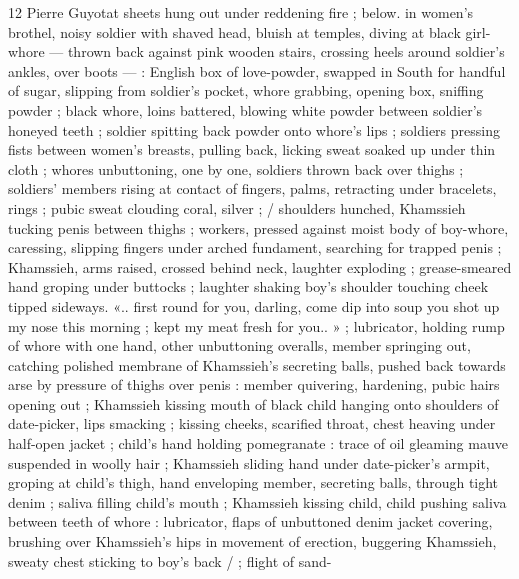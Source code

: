 12 Pierre Guyotat
sheets hung out under reddening fire ; below. in women's brothel,
noisy soldier with shaved head, bluish at temples, diving at black girl-
whore — thrown back against pink wooden stairs, crossing heels
around soldier's ankles, over boots — : English box of love-powder,
swapped in South for handful of sugar, slipping from soldier's
pocket, whore grabbing, opening box, sniffing powder ; black whore,
loins battered, blowing white powder between soldier's honeyed
teeth ; soldier spitting back powder onto whore's lips ; soldiers
pressing fists between women's breasts, pulling back, licking sweat
soaked up under thin cloth ; whores unbuttoning, one by one,
soldiers thrown back over thighs ; soldiers’ members rising at contact
of fingers, palms, retracting under bracelets, rings ; pubic sweat
clouding coral, silver ; / shoulders hunched, Khamssieh tucking penis
between thighs ; workers, pressed against moist body of boy-whore,
caressing, slipping fingers under arched fundament, searching for
trapped penis ; Khamssieh, arms raised, crossed behind neck,
laughter exploding ; grease-smeared hand groping under buttocks ;
laughter shaking boy's shoulder touching cheek tipped sideways. «..
first round for you, darling, come dip into soup you shot up my nose
this morning ; kept my meat fresh for you.. » ; lubricator, holding
rump of whore with one hand, other unbuttoning overalls, member
springing out, catching polished membrane of Khamssieh’s secreting
balls, pushed back towards arse by pressure of thighs over penis :
member quivering, hardening, pubic hairs opening out ; Khamssieh
kissing mouth of black child hanging onto shoulders of date-picker,
lips smacking ; kissing cheeks, scarified throat, chest heaving under
half-open jacket ; child's hand holding pomegranate : trace of oil
gleaming mauve suspended in woolly hair ; Khamssieh sliding hand
under date-picker's armpit, groping at child's thigh, hand enveloping
member, secreting balls, through tight denim ; saliva filling child's
mouth ; Khamssieh kissing child, child pushing saliva between teeth
of whore : lubricator, flaps of unbuttoned denim jacket covering,
brushing over Khamssieh's hips in movement of erection, buggering
Khamssieh, sweaty chest sticking to boy's back / ; flight of sand-

